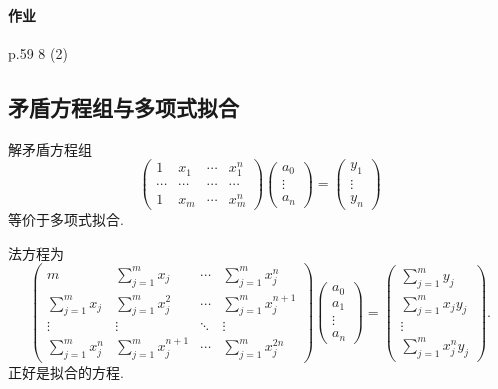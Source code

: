 \documentclass[hidelinks]{ctexart}
\begin{document}
\paragraph{作业} %
\label{par:作业}

p.59 8 (2)



\subsection{矛盾方程组与多项式拟合} %
\label{sub:矛盾方程组与多项式拟合}

\begin{theorem}
    解矛盾方程组
    \[ \begin{pmatrix}
        1 & x_1 & \cdots & x_1^n \\
        \cdots & \cdots & \cdots & \cdots \\
        1 & x_m & \cdots & x_m^n
    \end{pmatrix} \begin{pmatrix}
        a_0 \\ \vdots \\ a_n
    \end{pmatrix} = \begin{pmatrix}
        y_1 \\ \vdots \\ y_n
    \end{pmatrix} \]
    等价于多项式拟合.
\end{theorem}
法方程为
\[ \begin{pmatrix}
    \displaystyle m & \displaystyle \sum_{j=1}^m x_j & \cdots & \displaystyle \sum_{j=1}^m x_j^n \\
    \displaystyle \sum_{j=1}^m x_j & \displaystyle \sum_{j=1}^m x_j^2 & \cdots & \displaystyle \sum_{j=1}^m x_j^{n+1} \\
    \vdots & \vdots & \ddots & \vdots \\
    \displaystyle \sum_{j=1}^m x_j^n & \displaystyle \sum_{j=1}^m x_j^{n+1} & \cdots & \displaystyle \sum_{j=1}^m x_j^{2n}
\end{pmatrix} \begin{pmatrix}
    a_0 \\ a_1 \\ \vdots \\ a_n
\end{pmatrix} = \begin{pmatrix}
    \displaystyle \sum_{j=1}^m y_j \\
    \displaystyle \sum_{j=1}^m x_jy_j \\
    \vdots \\
    \displaystyle \sum_{j=1}^m x_j^ny_j
\end{pmatrix}. \]
正好是拟合的方程.
\end{document}
